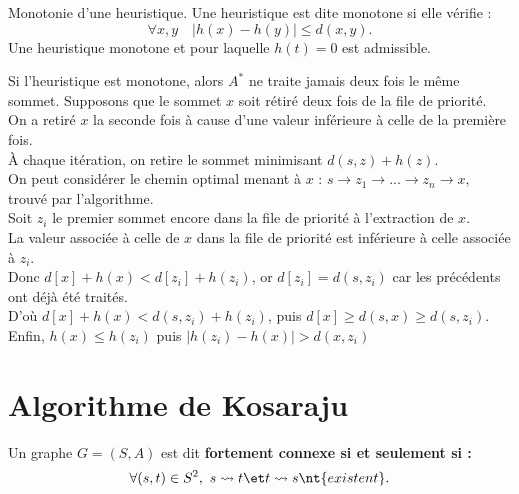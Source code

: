 \documentclass[french, 11pt]{article}
\begin{document}
\begin{defi}{Monotonie d'une heuristique.}{}
    Une heuristique est dite monotone si elle vérifie :
    \begin{equation*}
        \forall x,y \quad |h(x)-h(y)|\leq d(x,y).
    \end{equation*}
    Une heuristique monotone et pour laquelle $h(t)=0$ est admissible.
\end{defi}

\vspace*{-0.5cm}

\begin{prop}{}{}
    Si l'heuristique est monotone, alors $A^*$ ne traite jamais deux fois le même sommet.
    \tcblower
    Supposons que le sommet $x$ soit rétiré deux fois de la file de priorité.\\
    On a retiré $x$ la seconde fois à cause d'une valeur inférieure à celle de la première fois.\\
    À chaque itération, on retire le sommet minimisant $d(s,z)+h(z)$.\\
    On peut considérer le chemin optimal menant à $x$ : $s\to z_1 \to ... \to z_n \to x$, trouvé par l'algorithme.\\
    Soit $z_i$ le premier sommet encore dans la file de priorité à l'extraction de $x$.\\
    La valeur associée à celle de $x$ dans la file de priorité est inférieure à celle associée à $z_i$.\\
    Donc $d[x]+h(x) < d[z_i]+h(z_i)$, or $d[z_i]=d(s,z_i)$ car les précédents ont déjà été traités.\\
    D'où $d[x]+h(x) < d(s,z_i)+h(z_i)$, puis $d[x]\geq d(s,x) \geq d(s,z_i)$.\\
    Enfin, $h(x)\leq h(z_i)$ puis $|h(z_i)-h(x)| > d(x,z_i)$
\end{prop}

\vspace*{-0.5cm}

\section{Algorithme de Kosaraju}

\begin{defi}{}{}
    Un graphe $G=(S,A)$ est dit \bf{fortement connexe} si et seulement si :
    \begin{equation*}
        \forall (s,t) \in S^2, ~ s \leadsto t \et t \leadsto s \nt{ existent}. 
    \end{equation*}
\end{defi}
\end{document}
